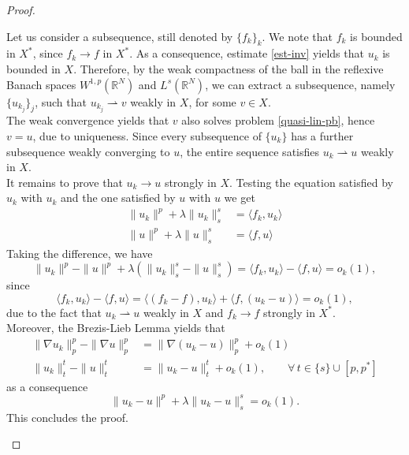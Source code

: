\documentclass[11pt,reqno]{amsart}
\theoremstyle{definition}
\numberwithin{equation}{section}
\numberwithin{theorem}{section}
\numberwithin{equation}{section}
\numberwithin{theorem}{section}
\newcommand{\R}{\mathbb{R}}
\newcommand{\raj}[1]{{\textcolor{magenta}{#1}}} %
\begin{document}
\begin{proof}
\begin{enumerate}
Let us consider a subsequence, still denoted by $\{f_k\}_k$. We note that $f_k$ is bounded in $X^*$, since $f_k\to f$ in $X^*$. As a consequence, estimate \eqref{est-inv} yields that $u_k$ is bounded in $X$. Therefore, by the weak compactness of the ball in the reflexive Banach spaces $W^{1,p}(\R^N)$ and $L^s(\R^N)$, we can extract a subsequence, namely $\{u_{k_j}\}_j$, such that $u_{k_j} \rightharpoonup v$ weakly in $X$, for some $v\in X$.\\

The weak convergence yields that $v$ also solves problem \eqref{quasi-lin-pb}, hence $v=u$, due to uniqueness.  %
Since every subsequence of $\{u_k\}$ has a further subsequence weakly converging to $u$, the entire sequence satisfies $u_k \rightharpoonup u$ weakly in $X$.\\

It remains to prove that $u_k\to u$ strongly in $X$. Testing the equation satisfied by $u_k$ with $u_k$ and the one satisfied by $u$ with $u$ we get
\begin{equation}
\begin{aligned}
\|u_k\|^p+\lambda\|u_k\|^s_s&=\langle f_k ,u_k\rangle    \\
\|u\|^p+\lambda\|u\|^s_s&=\langle f,u\rangle  
\end{aligned}    
\end{equation}
Taking the difference, we have
$$%
\|u_k\|^p-\|u\|^p+\lambda(\|u_k\|^s_s-\|u\|^s_s)=\langle f_k, u_k\rangle-\langle f, u\rangle =o_k(1),$$
since $$\langle f_k,u_k\rangle-\langle f,u\rangle=\langle(f_k-f),u_k\rangle+\langle f,(u_k-u)\rangle=o_k(1),$$
due to the fact that $u_k\rightharpoonup u$ weakly in $X$ and $f_k\to f$ strongly in $X^*$.\\

Moreover, the Brezis-Lieb Lemma yields that
\begin{equation}
\begin{aligned}
\|\nabla u_k\|^p_p-\|\nabla u\|^p_p&=\|\nabla(u_k-u)\|^p_p+o_k(1) \\
\|u_k\|^t_t-\|u\|^t_t&=\|u_k-u\|^t_t+o_k(1),\qquad\forall\,t\in\{s\}\cup[p,p^*]
\end{aligned}
\end{equation}
as a consequence $$\|u_k-u\|^p+\lambda\|u_k-u\|^s_s=o_k(1).$$
This concludes the proof.
\end{enumerate}
\end{proof}
\end{document}
